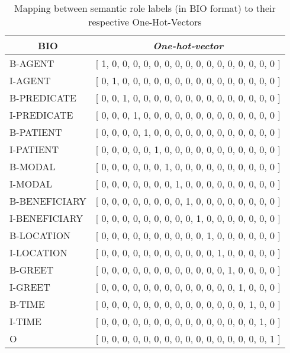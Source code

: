 \begin{table}
	\centering
	\caption{Mapping between semantic role labels (in BIO format) to their respective One-Hot-Vectors}
	\label{table:onehotlabel}
	\begin{tabular}{|l|l|}
		\hline
		\multicolumn{1}{|c|}{BIO} & \multicolumn{1}{c|}{\textit{One-hot-vector}} \\ \hline
		B-AGENT 				& {[} 1, 0, 0, 0, 0, 0, 0, 0, 0, 0, 0, 0, 0, 0, 0, 0, 0 {]} \\ \hline
		I-AGENT					& {[} 0, 1, 0, 0, 0, 0, 0, 0, 0, 0, 0, 0, 0, 0, 0, 0, 0 {]} \\ \hline
		B-PREDICATE 		& {[} 0, 0, 1, 0, 0, 0, 0, 0, 0, 0, 0, 0, 0, 0, 0, 0, 0 {]} \\ \hline
		I-PREDICATE 		& {[} 0, 0, 0, 1, 0, 0, 0, 0, 0, 0, 0, 0, 0, 0, 0, 0, 0 {]} \\ \hline
		B-PATIENT 			& {[} 0, 0, 0, 0, 1, 0, 0, 0, 0, 0, 0, 0, 0, 0, 0, 0, 0 {]} \\ \hline
		I-PATIENT			 & {[} 0, 0, 0, 0, 0, 1, 0, 0, 0, 0, 0, 0, 0, 0, 0, 0, 0 {]} \\ \hline
		B-MODAL 			& {[} 0, 0, 0, 0, 0, 0, 1, 0, 0, 0, 0, 0, 0, 0, 0, 0, 0 {]} \\ \hline
		I-MODAL 			& {[} 0, 0, 0, 0, 0, 0, 0, 1, 0, 0, 0, 0, 0, 0, 0, 0, 0 {]} \\ \hline
		B-BENEFICIARY 	& {[} 0, 0, 0, 0, 0, 0, 0, 0, 1, 0, 0, 0, 0, 0, 0, 0, 0 {]} \\ \hline
		I-BENEFICIARY 	& {[} 0, 0, 0, 0, 0, 0, 0, 0, 0, 1, 0, 0, 0, 0, 0, 0, 0 {]} \\ \hline
		B-LOCATION 		& {[} 0, 0, 0, 0, 0, 0, 0, 0, 0, 0, 1, 0, 0, 0, 0, 0, 0 {]} \\ \hline
		I-LOCATION		 & {[} 0, 0, 0, 0, 0, 0, 0, 0, 0, 0, 0, 1, 0, 0, 0, 0, 0 {]} \\ \hline
		B-GREET 			& {[} 0, 0, 0, 0, 0, 0, 0, 0, 0, 0, 0, 0, 1, 0, 0, 0, 0 {]} \\ \hline
		I-GREET 			& {[} 0, 0, 0, 0, 0, 0, 0, 0, 0, 0, 0, 0, 0, 1, 0, 0, 0 {]} \\ \hline
		B-TIME 				& {[} 0, 0, 0, 0, 0, 0, 0, 0, 0, 0, 0, 0, 0, 0, 1, 0, 0 {]} \\ \hline
		I-TIME 				& {[} 0, 0, 0, 0, 0, 0, 0, 0, 0, 0, 0, 0, 0, 0, 0, 1, 0 {]} \\ \hline
		O				& {[} 0, 0, 0, 0, 0, 0, 0, 0, 0, 0, 0, 0, 0, 0, 0, 0, 1 {]} \\ \hline
	\end{tabular}
\end{table}